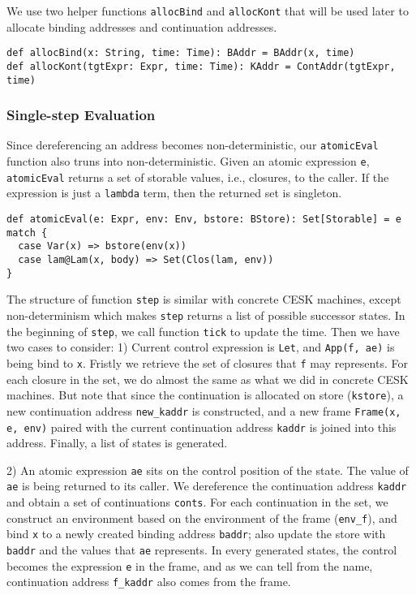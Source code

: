 \documentclass[acmsmall,review,anonymous]{acmart}\settopmatter{printfolios=true,printccs=false,printacmref=false}
\begin{document}
We use two helper functions \texttt{allocBind} and \texttt{allocKont} that will be used later
to allocate binding addresses and continuation addresses.

\begin{verbatim}
def allocBind(x: String, time: Time): BAddr = BAddr(x, time)
def allocKont(tgtExpr: Expr, time: Time): KAddr = ContAddr(tgtExpr, time)
\end{verbatim}

\subsubsection{Single-step Evaluation}

Since dereferencing an address becomes non-deterministic, our \texttt{atomicEval}
function also truns into non-deterministic. Given an atomic expression \texttt{e},
\texttt{atomicEval} returns a set of storable values, i.e., closures, to the caller.
If the expression is just a \texttt{lambda} term, then the returned set is singleton.

\begin{verbatim}
def atomicEval(e: Expr, env: Env, bstore: BStore): Set[Storable] = e match {
  case Var(x) => bstore(env(x))
  case lam@Lam(x, body) => Set(Clos(lam, env))
}
\end{verbatim}

The structure of function \texttt{step} is similar with concrete CESK machines, 
except non-determinism which makes \texttt{step} returns a list of possible
successor states.
In the beginning of \texttt{step}, we call function \texttt{tick} to update 
the time.
Then we have two cases to consider: 1) Current control expression is \texttt{Let},
and \texttt{App(f, ae)} is being bind to \texttt{x}.
Fristly we retrieve the set of closures that \texttt{f} may represents.
For each closure in the set, we do almost the same as what we did in concrete 
CESK machines. But note that since the continuation is allocated on store (\texttt{kstore}),
a new continuation address \texttt{new_kaddr} is constructed, and a new frame
\texttt{Frame(x, e, env)} paired with the current continuation address \texttt{kaddr}
is joined into this address. Finally, a list of states is generated.

2) An atomic expression \texttt{ae} sits on the control position of the state.
The value of \texttt{ae} is being returned to its caller. 
We dereference the continuation address \texttt{kaddr} and obtain a set of
continuations \texttt{conts}.
For each continuation in the set, we construct an environment based on the
environment of the frame (\texttt{env_f}), and bind \texttt{x} to a newly created binding 
address \texttt{baddr}; also update the store with \texttt{baddr} and 
the values that \texttt{ae} represents. In every generated states,
the control becomes the expression \texttt{e} in the frame,
and as we can tell from the name, continuation address \texttt{f_kaddr} 
also comes from the frame.
\end{document}
